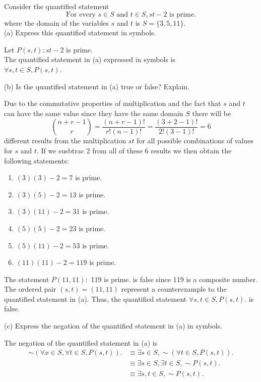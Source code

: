 \documentclass[12pt]{article}
\newenvironment{problem}[2][Problem]{\begin{trivlist}
		\item[\hskip \labelsep {\bfseries #1}\hskip \labelsep {\bfseries #2.}]}{\end{trivlist}}
\newenvironment{solution}[2][Solution]{\begin{trivlist}
		\item[\hskip \labelsep {\bfseries #1}\hskip \labelsep {\bfseries #2.}]}{\end{trivlist}}
\begin{document}
\begin{problem}{75}
	Consider the quantified statement
	\begin{equation*}
		\text{For every }s\in S \text{ and } t\in S,st-2 \text{ is prime.}
	\end{equation*}
	where the domain of the variables $s$ and $t$ is $S=\{3,5,11\}.$\\
	
	(a) Express this quantified statement in symbols.
	\begin{solution}{a} 
		Let $P(s,t) : st-2$ is prime.\\
		The quantified statement in (a) expressed in symbols is\\
		$\forall s,t \in S, P(s,t)$.
	\end{solution}
	
	(b) Is the quantified statement in (a) true or false? Explain.
	\begin{solution}{b}
		Due to the commutative properties of multiplication and the fact that $s$ and $t$ can have the same value since they have the same domain $S$ there will be \cite{Kombinatorik} 
		\begin{equation*}
			\binom{n+r-1}{r}=\frac{(n+r-1)!}{r!(n-1)!} = \frac{(3+2-1)!}{2!(3-1)!} = 6
		\end{equation*} different results from the multiplication $st$ for all possible combinations of values for $s$ and $t$. If we susbtrac 2 from all of these 6 results we then obtain the following statements:
	\begin{enumerate}
		\item $(3)(3) -2 = 7$ is prime. 
		\item $(3)(5)-2=13$ is prime.
		\item $(3)(11)-2=31$ is prime.
		\item $(5)(5)-2=23$ is prime.
		\item $(5)(11)-2 = 53$ is prime.
		\item $(11)(11)-2=119$ is prime.  
	\end{enumerate}
	The statement $P(11,11):$ 119 is prime. is false since 119 is a composite number. The ordered pair $(s,t)=(11,11)$ represent a counterexample to the quantified statement in (a). Thus, the quantified statement $\forall s,t \in S, P(s,t)$. is false.
	\end{solution}

	(c) Express the negation of the quantified statement in (a) in symbols.
	\begin{solution}{c}
		The negation of the quantified statement in (a) is
		\begin{align*}
			\sim(\forall x\in S, \forall t\in S, P(s,t)). & \equiv \exists s \in S, \sim(\forall t\in S, P(s,t)).\\
			& \equiv \exists s \in S, \exists t \in S, \sim P(s,t).\\
			& \equiv \exists s,t\in S, \sim P(s,t).
		\end{align*}
	\end{solution}
	

\end{problem}
\end{document}
